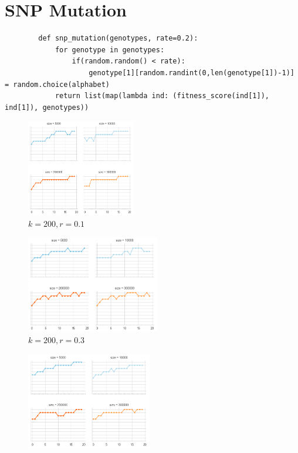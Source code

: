 \documentclass{article}
\begin{document}
		\section{SNP Mutation}
		\begin{lstlisting}
		def snp_mutation(genotypes, rate=0.2):
			for genotype in genotypes:
				if(random.random() < rate):
					genotype[1][random.randint(0,len(genotype[1])-1)] = random.choice(alphabet)
			return list(map(lambda ind: (fitness_score(ind[1]), ind[1]), genotypes))
		\end{lstlisting}
		\begin{multicols}{2}
		\begin{figure}[H]
			\center
			\includegraphics[width=\linewidth, height=120pt]{data/walk_Ng20_k200_snp_01.png}
			\caption{\(k=200, r=0.1\)}
	  		\label{fig:walk200ksnp01}
  		\end{figure}
  		\begin{figure}[H]
			\center
			\includegraphics[width=\linewidth, height=120pt]{data/walk_Ng20_k200_snp_03.png}
			\caption{\(k=200, r=0.3\)}
	  		\label{fig:walk200ksnp03}
  		\end{figure}
  		\begin{figure}[H]
			\center
			\includegraphics[width=\linewidth, height=120pt]{data/walk_Ng20_k200_snp_02.png}

\end{figure}
\end{multicols}
\end{document}
